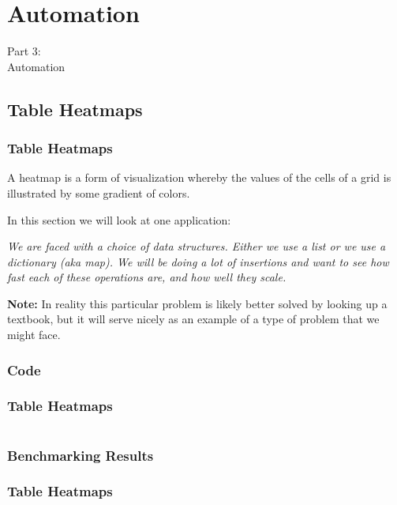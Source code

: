 {
\renewcommand{\bgcolor}{auto}

\section{Automation}
\begin{frame}
  \vspace{25mm}
  \begin{center}
    \Huge{Part 3:\\Automation}
  \end{center}
\end{frame}

\subsection{Table Heatmaps}
\begin{frame}[fragile]
  \frametitle{Table Heatmaps}
  \vspace{3mm}
  A heatmap is a form of visualization whereby the values of the cells of a grid is illustrated by some gradient of colors.
  
  \vspace{5mm}
  In this section we will look at one application:
  
  \begin{center}
    \textsl{We are faced with a choice of data structures. Either we use a list or we use a dictionary (aka map). We will be doing a lot of insertions and want to see how fast each of these operations are, and how well they scale.}
  \end{center}
  
  \vspace{5mm}
  \textbf{Note:} In reality this particular problem is likely better solved by looking up a textbook, but it will serve nicely as an example of a type of problem that we might face.
\end{frame}

\subsubsection{Code}
\begin{frame}[fragile]
  \frametitle{Table Heatmaps }
  \vspace{0mm}
  \inputminted[fontsize=\tiny]{python}{../src/table_heatmap/code.py}
\end{frame}

\subsubsection{Benchmarking Results}
\begin{frame}[fragile]
  \frametitle{Table Heatmaps }
  \vspace{-1mm}
  \inputminted[fontsize=\footnotesize]{text}{../src/table_heatmap/code.txt}
\end{frame}

}
